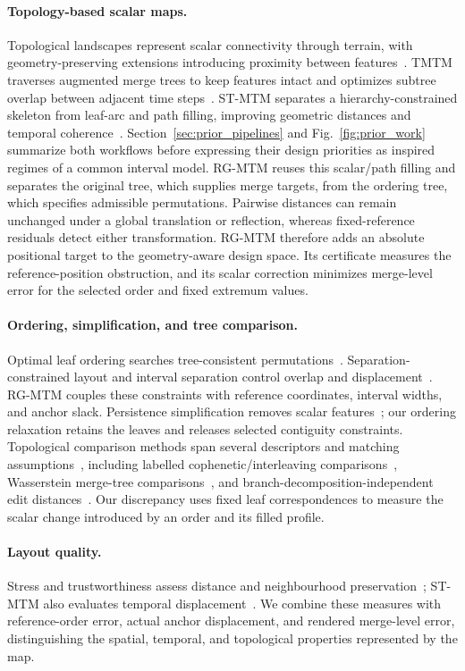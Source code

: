 \paragraph{Topology-based scalar maps.}
Topological landscapes represent scalar connectivity through terrain, with geometry-preserving extensions introducing proximity between features~\cite{Weber:2007:TL,Beketayev:2012:GPTL}. TMTM traverses augmented merge trees to keep features intact and optimizes subtree overlap between adjacent time steps~\cite{Koepp:2023:TMTM}. ST-MTM separates a hierarchy-constrained skeleton from leaf-arc and path filling, improving geometric distances and temporal coherence~\cite{STMTM:2026}. Section~\ref{sec:prior_pipelines} and Fig.~\ref{fig:prior_work} summarize both workflows before expressing their design priorities as inspired regimes of a common interval model. RG-MTM reuses this scalar/path filling and separates the original tree, which supplies merge targets, from the ordering tree, which specifies admissible permutations. Pairwise distances can remain unchanged under a global translation or reflection, whereas fixed-reference residuals detect either transformation. RG-MTM therefore adds an absolute positional target to the geometry-aware design space. Its certificate measures the reference-position obstruction, and its scalar correction minimizes merge-level error for the selected order and fixed extremum values.

\paragraph{Ordering, simplification, and tree comparison.}
Optimal leaf ordering searches tree-consistent permutations~\cite{BarJoseph:2001:OLO}. Separation-constrained layout and interval separation control overlap and displacement~\cite{Dwyer:2006:IPSEP,Li:2019:SOI}. RG-MTM couples these constraints with reference coordinates, interval widths, and anchor slack. Persistence simplification removes scalar features~\cite{Edelsbrunner:2002:TPS,Tierny:2012:GTS}; our ordering relaxation retains the leaves and releases selected contiguity constraints. Topological comparison methods span several descriptors and matching assumptions~\cite{Yan:2021:Survey}, including labelled cophenetic/interleaving comparisons~\cite{Munch:2019:LINF,Yan:2022:GAMT}, Wasserstein merge-tree comparisons~\cite{Pont:2022:WMT}, and branch-decomposition-independent edit distances~\cite{Wetzels:2022:BDI}. Our discrepancy uses fixed leaf correspondences to measure the scalar change introduced by an order and its filled profile.

\paragraph{Layout quality.}
Stress and trustworthiness assess distance and neighbourhood preservation~\cite{Smelser:2025:Scale,Venna:2001:NP,Nonato:2019:MP}; ST-MTM also evaluates temporal displacement~\cite{STMTM:2026}. We combine these measures with reference-order error, actual anchor displacement, and rendered merge-level error, distinguishing the spatial, temporal, and topological properties represented by the map.
